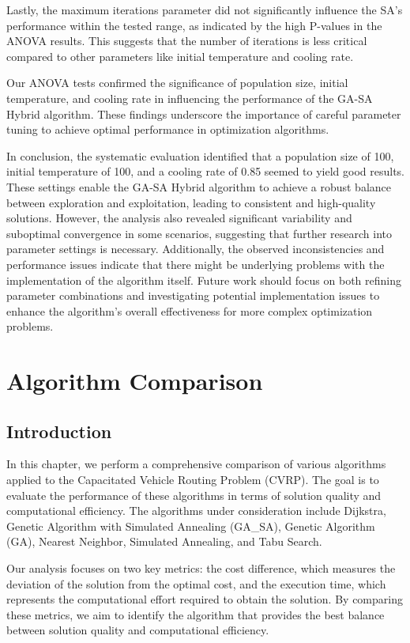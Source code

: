 \documentclass[
]{article}
\begin{document}
    Lastly, the maximum iterations parameter did not significantly influence the SA's performance within the tested range, as indicated by the high P-values in the ANOVA results. This suggests that the number of iterations is less critical compared to other parameters like initial temperature and cooling rate.

    Our ANOVA tests confirmed the significance of population size, initial temperature, and cooling rate in influencing the performance of the GA-SA Hybrid algorithm. These findings underscore the importance of careful parameter tuning to achieve optimal performance in optimization algorithms.

    In conclusion, the systematic evaluation identified that a population size of 100, initial temperature of 100, and a cooling rate of 0.85 seemed to yield good results. These settings enable the GA-SA Hybrid algorithm to achieve a robust balance between exploration and exploitation, leading to consistent and high-quality solutions. However, the analysis also revealed significant variability and suboptimal convergence in some scenarios, suggesting that further research into parameter settings is necessary. Additionally, the observed inconsistencies and performance issues indicate that there might be underlying problems with the implementation of the algorithm itself. Future work should focus on both refining parameter combinations and investigating potential implementation issues to enhance the algorithm's overall effectiveness for more complex optimization problems.


    \section{Algorithm Comparison}

    \subsection{Introduction}

    In this chapter, we perform a comprehensive comparison of various algorithms applied to the Capacitated Vehicle Routing Problem (CVRP). The goal is to evaluate the performance of these algorithms in terms of solution quality and computational efficiency. The algorithms under consideration include Dijkstra, Genetic Algorithm with Simulated Annealing (GA\_SA), Genetic Algorithm (GA), Nearest Neighbor, Simulated Annealing, and Tabu Search.

    Our analysis focuses on two key metrics: the cost difference, which measures the deviation of the solution from the optimal cost, and the execution time, which represents the computational effort required to obtain the solution. By comparing these metrics, we aim to identify the algorithm that provides the best balance between solution quality and computational efficiency.
\end{document}
